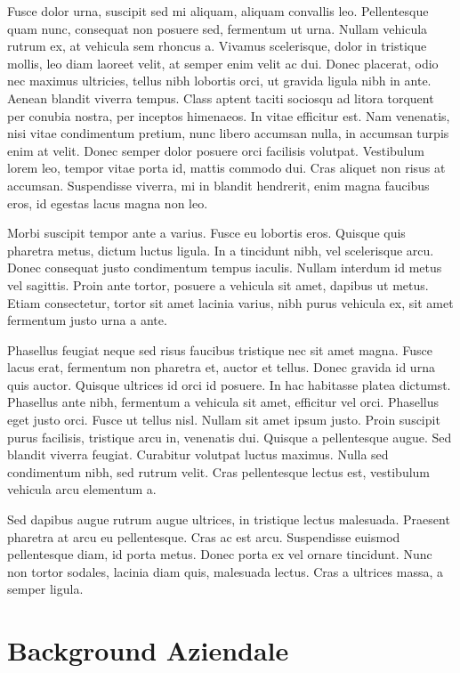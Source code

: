 \documentclass[target=bach,aauheader=,style=]{thud}
\begin{document}
Fusce dolor urna, suscipit sed mi aliquam, aliquam convallis leo. Pellentesque quam nunc, consequat non posuere sed, fermentum ut urna. Nullam vehicula rutrum ex, at vehicula sem rhoncus a. Vivamus scelerisque, dolor in tristique mollis, leo diam laoreet velit, at semper enim velit ac dui. Donec placerat, odio nec maximus ultricies, tellus nibh lobortis orci, ut gravida ligula nibh in ante. Aenean blandit viverra tempus. Class aptent taciti sociosqu ad litora torquent per conubia nostra, per inceptos himenaeos. In vitae efficitur est. Nam venenatis, nisi vitae condimentum pretium, nunc libero accumsan nulla, in accumsan turpis enim at velit. Donec semper dolor posuere orci facilisis volutpat. Vestibulum lorem leo, tempor vitae porta id, mattis commodo dui. Cras aliquet non risus at accumsan. Suspendisse viverra, mi in blandit hendrerit, enim magna faucibus eros, id egestas lacus magna non leo.

Morbi suscipit tempor ante a varius. Fusce eu lobortis eros. Quisque quis pharetra metus, dictum luctus ligula. In a tincidunt nibh, vel scelerisque arcu. Donec consequat justo condimentum tempus iaculis. Nullam interdum id metus vel sagittis. Proin ante tortor, posuere a vehicula sit amet, dapibus ut metus. Etiam consectetur, tortor sit amet lacinia varius, nibh purus vehicula ex, sit amet fermentum justo urna a ante.

Phasellus feugiat neque sed risus faucibus tristique nec sit amet magna. Fusce lacus erat, fermentum non pharetra et, auctor et tellus. Donec gravida id urna quis auctor. Quisque ultrices id orci id posuere. In hac habitasse platea dictumst. Phasellus ante nibh, fermentum a vehicula sit amet, efficitur vel orci. Phasellus eget justo orci. Fusce ut tellus nisl. Nullam sit amet ipsum justo. Proin suscipit purus facilisis, tristique arcu in, venenatis dui. Quisque a pellentesque augue. Sed blandit viverra feugiat. Curabitur volutpat luctus maximus. Nulla sed condimentum nibh, sed rutrum velit. Cras pellentesque lectus est, vestibulum vehicula arcu elementum a.

Sed dapibus augue rutrum augue ultrices, in tristique lectus malesuada. Praesent pharetra at arcu eu pellentesque. Cras ac est arcu. Suspendisse euismod pellentesque diam, id porta metus. Donec porta ex vel ornare tincidunt. Nunc non tortor sodales, lacinia diam quis, malesuada lectus. Cras a ultrices massa, a semper ligula.

\chapter{Background Aziendale}
\end{document}

